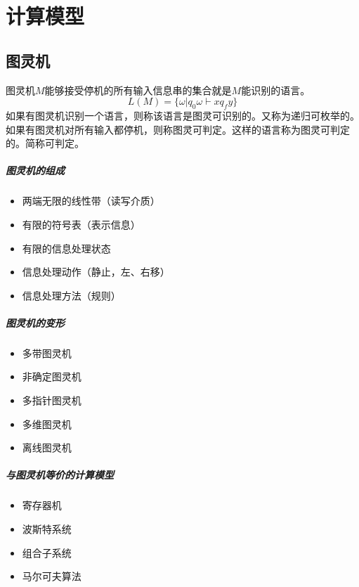\chapter{计算模型}
\section{图灵机}
\label{sec:TuringMachine}
图灵机$M$能够接受停机的所有输入信息串的集合就是$M$能识别的语言。       
\begin{equation*}
        L(M) = \{ \omega | q_0 \omega \vdash  xq_fy \}
\end{equation*}
如果有图灵机识别一个语言，则称该语言是图灵可识别的。又称为递归可枚举的。
如果有图灵机对所有输入都停机，则称图灵可判定。这样的语言称为图灵可判定的。简称可判定。

\paragraph{图灵机的组成}
\begin{itemize}
        \item 两端无限的线性带（读写介质）
        \item 有限的符号表（表示信息）
        \item 有限的信息处理状态
        \item 信息处理动作（静止，左、右移）
        \item 信息处理方法（规则）
\end{itemize}
\paragraph{图灵机的变形}
\begin{itemize}
        \item 多带图灵机
        \item 非确定图灵机
        \item 多指针图灵机
        \item 多维图灵机
        \item 离线图灵机
\end{itemize}
\paragraph{与图灵机等价的计算模型}
\begin{itemize}
        \item 寄存器机
        \item 波斯特系统
        \item 组合子系统
        \item 马尔可夫算法
\end{itemize}

